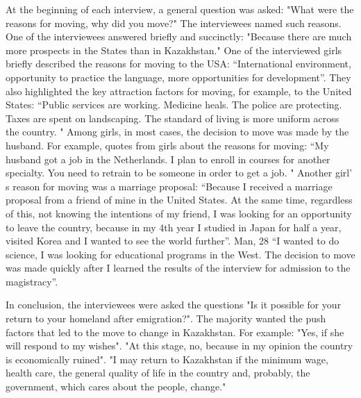 At the beginning of each interview, a general question was asked: "What
were the reasons for moving, why did you move?" The interviewees named
such reasons. One of the interviewees answered briefly and succinctly:
"Because there are much more prospects in the States than in
Kazakhstan." One of the interviewed girls briefly described the reasons
for moving to the USA: ``International environment, opportunity to
practice the language, more opportunities for development''. They also
highlighted the key attraction factors for moving, for example, to the
United States: ``Public services are working. Medicine heals. The police
are protecting. Taxes are spent on landscaping. The standard of living
is more uniform across the country. " Among girls, in most cases, the
decision to move was made by the husband. For example, quotes from girls
about the reasons for moving: ``My husband got a job in the Netherlands.
I plan to enroll in courses for another specialty. You need to retrain
to be someone in order to get a job. " Another girl' s
reason for moving was a marriage proposal: ``Because I received a
marriage proposal from a friend of mine in the United States. At the
same time, regardless of this, not knowing the intentions of my friend,
I was looking for an opportunity to leave the country, because in my 4th
year I studied in Japan for half a year, visited Korea and I wanted to
see the world further''. Man, 28 ``I wanted to do science, I was looking
for educational programs in the West. The decision to move was made
quickly after I learned the results of the interview for admission to
the magistracy''.

In conclusion, the interviewees were asked the questions "Is it possible
for your return to your homeland after emigration?". The majority wanted
the push factors that led to the move to change in Kazakhstan. For
example: "Yes, if she will respond to my wishes". "At this stage, no,
because in my opinion the country is economically ruined". "I may return
to Kazakhstan if the minimum wage, health care, the general quality of
life in the country and, probably, the government, which cares about the
people, change."

